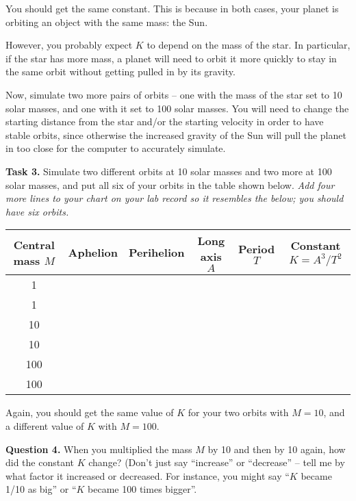 \documentclass[11pt]{article}
\begin{document}
You should get the same constant. This is because in both cases, your planet is orbiting an object with the same mass: the Sun.

However, you probably expect $K$ to depend on the mass of the star. In particular, if the star has more mass, a planet will need to orbit it more quickly to stay in the same orbit without getting pulled in by its gravity.

\bigskip

Now, simulate two more pairs of orbits -- one with the mass of the star set to 10 solar masses, and one with it set to 100 solar masses. You will need to change the starting distance from the star and/or the starting velocity in order to have stable orbits, since otherwise the increased gravity of the Sun will pull the planet in too close for the computer to accurately simulate. 



{\bf Task 3.} Simulate two different orbits at 10 solar masses and two more at 100 solar masses, and put all six of your orbits in the table shown below. {\it Add four more lines to your chart on your lab record so it resembles the below; you should have six orbits.}

\begin{center}
	\large
	\begin{tabular}{|c|c|c|c|c|c|}
		\hline
		Central mass $M$ & Aphelion & Perihelion & Long axis $A$ & Period $T$ & Constant $K = A^3 / T^2$ \\ \hline
		1 & & & & &  \\ \hline
		1 & & & & &  \\ \hline
		10 & & & & &  \\ \hline
		10 & & & & &  \\ \hline
		100 & & & & &  \\ \hline
		100 & & & & &  \\ \hline
	\end{tabular}

\end{center}



Again, you should get the same value of $K$ for your two orbits with $M=10$, and a different value of $K$ with $M=100$.

\bigskip
{\bf Question 4.} When you multiplied the mass $M$ by 10 and then by 10 again, how did the constant $K$ change? (Don’t just say “increase” or “decrease” -- tell me by what factor it increased or decreased. For instance, you might say “$K$ became 1/10 as big” or “$K$ became 100 times bigger”.
\end{document}
